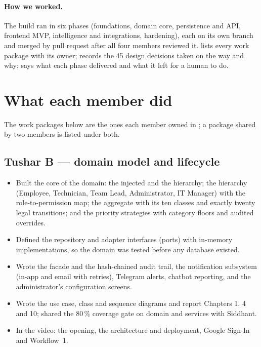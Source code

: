 \paragraph{How we worked.} The build ran in six phases (foundations, domain core, persistence and
API, frontend MVP, intelligence and integrations, hardening), each on its own branch and merged
by pull request after all four members reviewed it.  lists every work
package with its owner;  records the 45 design decisions taken on the
way and why;  says what each phase delivered and what it left for a
human to do.

\section{What each member did}
The work packages below are the ones each member owned in ; a package shared
by two members is listed under both.

\subsection*{Tushar B --- domain model and lifecycle}
\begin{itemize}
  \item Built the core of the domain: the injected  and the 
    hierarchy; the  hierarchy (Employee, Technician, Team Lead, Administrator, IT
    Manager) with the role-to-permission map; the  aggregate with its ten
     classes and exactly twenty legal transitions; and the priority strategies with
    category floors and audited overrides.
  \item Defined the repository and adapter interfaces (ports) with in-memory implementations, so
    the domain was tested before any database existed.
  \item Wrote the  facade and the hash-chained audit trail, the
    notification subsystem (in-app and email with retries), Telegram alerts, chatbot
    reporting, and the administrator's configuration screens.
  \item Wrote the use case, class and sequence diagrams and report Chapters 1, 4 and 10; shared
    the 80\,\% coverage gate on domain and services with Siddhant.
  \item In the video: the opening, the architecture and deployment, Google Sign-In and
    Workflow~1.
\end{itemize}

